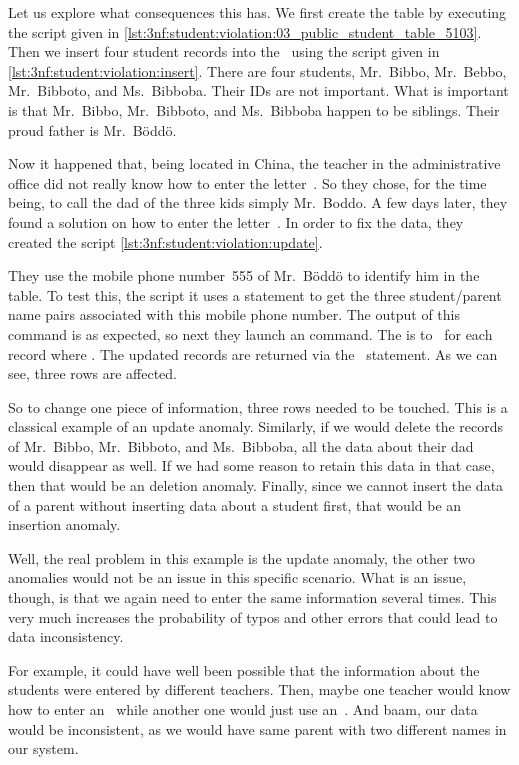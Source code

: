 Let us explore what consequences this has.
We first create the table by executing the script given in \cref{lst:3nf:student:violation:03_public_student_table_5103}.
Then we insert four student records into the \db\ using the script given in \cref{lst:3nf:student:violation:insert}.
There are four students, Mr.~Bibbo, Mr.~Bebbo, Mr.~Bibboto, and Ms.~Bibboba.
Their IDs are not important.
What is important is that Mr.~Bibbo, Mr.~Bibboto, and Ms.~Bibboba happen to be siblings.
Their proud father is Mr.~B{\"o}dd{\"o}.

Now it happened that, being located in China, the teacher in the administrative office did not really know how to enter the letter~.
So they chose, for the time being, to call the dad of the three kids simply Mr.~Boddo.
A few days later, they found a solution on how to enter the letter~.
In order to fix the data, they created the script \cref{lst:3nf:student:violation:update}.

They use the mobile phone number~555 of Mr.~B{\"o}dd{\"o} to identify him in the table.
To test this, the script it uses a  statement to get the three student/parent name pairs associated with this mobile phone number.
The output of this command is as expected, so next they launch an  command.
The  is  to~ for each record where .
The updated records are returned via the~ statement.
As we can see, three rows are affected.

So to change one piece of information, three rows needed to be touched.
This is a classical example of an update anomaly.
Similarly, if we would delete the records of Mr.~Bibbo, Mr.~Bibboto, and Ms.~Bibboba, all the data about their dad would disappear as well.
If we had some reason to retain this data in that case, then that would be an deletion anomaly.
Finally, since we cannot insert the data of a parent without inserting data about a student first, that would be an insertion anomaly.

Well, the real problem in this example is the update anomaly, the other two anomalies would not be an issue in this specific scenario.
What is an issue, though, is that we again need to enter the same information several times.
This very much increases the probability of typos and other errors that could lead to data inconsistency.

For example, it could have well been possible that the information about the students were entered by different teachers.
Then, maybe one teacher would know how to enter an~ while another one would just use an~.
And baam, our data would be inconsistent, as we would have same parent with two different names in our system.%
%
\FloatBarrier%
\endhsection%
%
